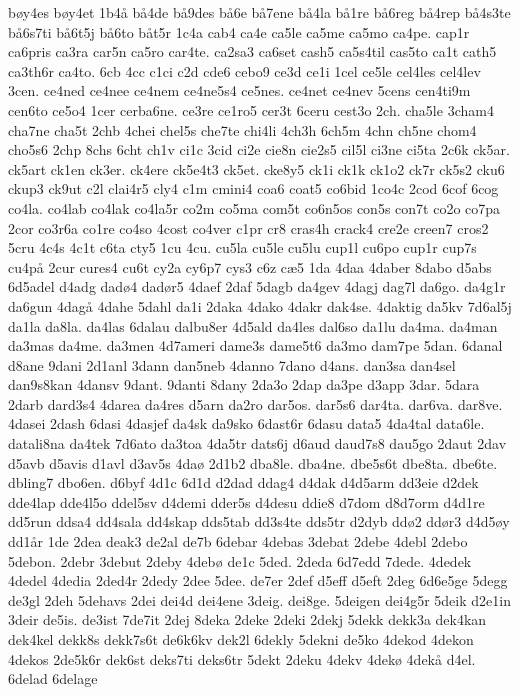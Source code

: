 {bøy4es
bøy4et
1b4å
bå4de
bå9des
bå6e
bå7ene
bå4la
bå1re
bå6reg
bå4rep
bå4s3te
bå6s7ti
bå6t5j
bå6to
båt5r
1c4a
cab4
ca4e
ca5le
ca5me
ca5mo
ca4pe.
cap1r
ca6pris
ca3ra
car5n
ca5ro
car4te.
ca2sa3
ca6set
cash5
ca5s4til
cas5to
ca1t
cath5
ca3th6r
ca4to.
6cb
4cc
c1ci
c2d
cde6
cebo9
ce3d
ce1i
1cel
ce5le
cel4les
cel4lev
3cen.
ce4ned
ce4nee
ce4nem
ce4ne5s4
ce5nes.
ce4net
ce4nev
5cens
cen4ti9m
cen6to
ce5o4
1cer
cerba6ne.
ce3re
ce1ro5
cer3t
6ceru
cest3o
2ch.
cha5le
3cham4
cha7ne
cha5t
2chb
4chei
chel5s
che7te
chi4li
4ch3h
6ch5m
4chn
ch5ne
chom4
cho5s6
2chp
8chs
6cht
ch1v
ci1c
3cid
ci2e
cie8n
cie2s5
cil5l
ci3ne
ci5ta
2c6k
ck5ar.
ck5art
ck1en
ck3er.
ck4ere
ck5e4t3
ck5et.
cke8y5
ck1i
ck1k
ck1o2
ck7r
ck5s2
cku6
ckup3
ck9ut
c2l
clai4r5
cly4
c1m
cmini4
coa6
coat5
co6bid
1co4c
2cod
6cof
6cog
co4la.
co4lab
co4lak
co4la5r
co2m
co5ma
com5t
co6n5os
con5s
con7t
co2o
co7pa
2cor
co3r6a
co1re
co4so
4cost
co4ver
c1pr
cr8
cras4h
crack4
cre2e
creen7
cros2
5cru
4c4s
4c1t
c6ta
cty5
1cu
4cu.
cu5la
cu5le
cu5lu
cup1l
cu6po
cup1r
cup7s
cu4på
2cur
cures4
cu6t
cy2a
cy6p7
cys3
c6z
cæ5
1da
4daa
4daber
8dabo
d5abs
6d5adel
d4adg
dadø4
dadør5
4daef
2daf
5dagb
da4gev
4dagj
dag7l
da6go.
da4g1r
da6gun
4dagå
4dahe
5dahl
da1i
2daka
4dako
4dakr
dak4se.
4daktig
da5kv
7d6al5j
da1la
da8la.
da4las
6dalau
dalbu8er
4d5ald
da4les
dal6so
da1lu
da4ma.
da4man
da3mas
da4me.
da3men
4d7ameri
dame3s
dame5t6
da3mo
dam7pe
5dan.
6danal
d8ane
9dani
2d1anl
3dann
dan5neb
4danno
7dano
d4ans.
dan3sa
dan4sel
dan9s8kan
4dansv
9dant.
9danti
8dany
2da3o
2dap
da3pe
d3app
3dar.
5dara
2darb
dard3s4
4darea
da4res
d5arn
da2ro
dar5os.
dar5s6
dar4ta.
dar6va.
dar8ve.
4dasei
2dash
6dasi
4dasjef
da4sk
da9sko
6dast6r
6dasu
data5
4da4tal
data6le.
datali8na
da4tek
7d6ato
da3toa
4da5tr
dats6j
d6aud
daud7s8
dau5go
2daut
2dav
d5avb
d5avis
d1avl
d3av5s
4daø
2d1b2
dba8le.
dba4ne.
dbe5s6t
dbe8ta.
dbe6te.
dbling7
dbo6en.
d6byf
4d1c
6d1d
d2dad
ddag4
d4dak
d4d5arm
dd3eie
d2dek
dde4lap
dde4l5o
ddel5sv
d4demi
dder5s
d4desu
ddie8
d7dom
d8d7orm
d4d1re
dd5run
ddsa4
dd4sala
dd4skap
dds5tab
dd3s4te
dds5tr
d2dyb
ddø2
ddør3
d4d5øy
dd1år
1de
2dea
deak3
de2al
de7b
6debar
4debas
3debat
2debe
4debl
2debo
5debon.
2debr
3debut
2deby
4debø
de1c
5ded.
2deda
6d7edd
7dede.
4dedek
4dedel
4dedia
2ded4r
2dedy
2dee
5dee.
de7er
2def
d5eff
d5eft
2deg
6d6e5ge
5degg
de3gl
2deh
5dehavs
2dei
dei4d
dei4ene
3deig.
dei8ge.
5deigen
dei4g5r
5deik
d2e1in
3deir
de5is.
de3ist
7de7it
2dej
8deka
2deke
2deki
2dekj
5dekk
dekk3a
dek4kan
dek4kel
dekk8s
dekk7s6t
de6k6kv
dek2l
6dekly
5dekni
de5ko
4dekod
4dekon
4dekos
2de5k6r
dek6st
deks7ti
deks6tr
5dekt
2deku
4dekv
4dekø
4dekå
d4el.
6delad
6delage
}
